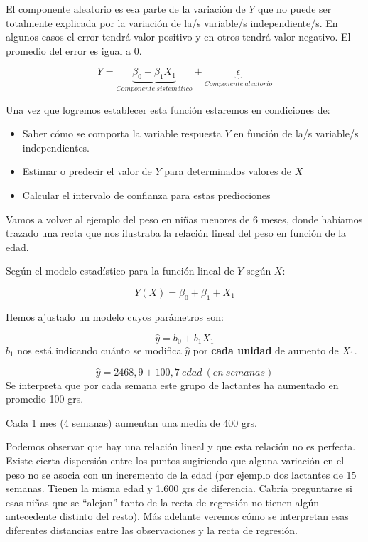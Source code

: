 \documentclass[
  letterpaper,
  DIV=11,
  numbers=noendperiod]{scrartcl}
\begin{document}
El componente aleatorio es esa parte de la variación de \(Y\) que no
puede ser totalmente explicada por la variación de la/s variable/s
independiente/s. En algunos casos el error tendrá valor positivo y en
otros tendrá valor negativo. El promedio del error es igual a 0.

\[
Y = \underbrace{\beta_0 + \beta_1 X_1}_{Componente \: sistemático} + \underbrace{\epsilon}_{Componente \: aleatorio}
\]

Una vez que logremos establecer esta función estaremos en condiciones
de:

\begin{itemize}
\item
  Saber cómo se comporta la variable respuesta \(Y\) en función de la/s
  variable/s independientes.
\item
  Estimar o predecir el valor de \(Y\) para determinados valores de
  \(X\)
\item
  Calcular el intervalo de confianza para estas predicciones
\end{itemize}

Vamos a volver al ejemplo del peso en niñas menores de 6 meses, donde
habíamos trazado una recta que nos ilustraba la relación lineal del peso
en función de la edad.

Según el modelo estadístico para la función lineal de \(Y\) según \(X\):

\[Y(X) =  \beta_0 + \beta_1 + X_1\]

Hemos ajustado un modelo cuyos parámetros son:

\[\hat{y} = b_0 + b_1X_1\] \(b_1\) nos está indicando cuánto se modifica
\(\hat{y}\) por \textbf{cada unidad} de aumento de \(X_1\).

\[\hat{y} = 2468,9 + 100,7 \: edad \: (en \: semanas) \] Se interpreta
que por cada semana este grupo de lactantes ha aumentado en promedio 100
grs.

Cada 1 mes (4 semanas) aumentan una media de 400 grs.

Podemos observar que hay una relación lineal y que esta relación no es
perfecta. Existe cierta dispersión entre los puntos sugiriendo que
alguna variación en el peso no se asocia con un incremento de la edad
(por ejemplo dos lactantes de 15 semanas. Tienen la misma edad y 1.600
grs de diferencia. Cabría preguntarse si esas niñas que se ``alejan''
tanto de la recta de regresión no tienen algún antecedente distinto del
resto). Más adelante veremos cómo se interpretan esas diferentes
distancias entre las observaciones y la recta de regresión.
\end{document}
